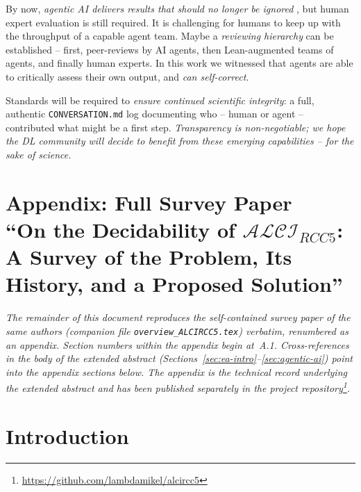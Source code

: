 \documentclass[
]{ceurart}
\theoremstyle{definition}
\newcommand{\ALCIRCC}[1]{\ensuremath{\mathcal{ALCI}_{\mathit{RCC#1}}}}
\newcommand{\Lean}{\textsf{Lean}}
\begin{document}
By now, \emph{agentic AI delivers results that should no longer be
ignored} \cite{TaoKlowden2026, Knuth2026ClaudesCycles}, but human
expert evaluation is still required. It is challenging for humans to
keep up with the throughput of a capable agent team. Maybe a
\emph{reviewing hierarchy} can be established -- first, peer-reviews
by AI agents, then \Lean-augmented teams of agents, and finally human
experts. In this work we witnessed that agents are able to critically
assess their own output, and \emph{can self-correct.}

Standards will be required to \emph{ensure continued scientific
integrity}: a full, authentic {\tt CONVERSATION.md} log documenting
who -- human or agent -- contributed what might be a first step.
\emph{Transparency is non-negotiable; we hope the DL community will
decide to benefit from these emerging capabilities -- for the sake of
science.}

\clearpage
\appendix

\section*{Appendix: Full Survey Paper\\\normalsize\normalfont
  ``On the Decidability of $\ALCIRCC{5}$:
  A Survey of the Problem, Its History, and a Proposed Solution''}
\label{sec:appendix}

\noindent\emph{The remainder of this document reproduces the
self-contained survey paper of the same authors (companion file
\texttt{overview\_ALCIRCC5.tex}) verbatim, renumbered as an appendix.
Section numbers within the appendix begin at~A.1.
Cross-references in the body of the extended abstract
(Sections~\ref{sec:ea-intro}--\ref{sec:agentic-ai}) point into the
appendix sections below. The appendix is the technical record
underlying the extended abstract and has been published
separately in the project repository\footnote{%
\url{https://github.com/lambdamikel/alcircc5}}.}

\renewcommand{\thesection}{A.\arabic{section}}
\setcounter{section}{0}

\section{Introduction}
\label{sec:intro}
\end{document}
